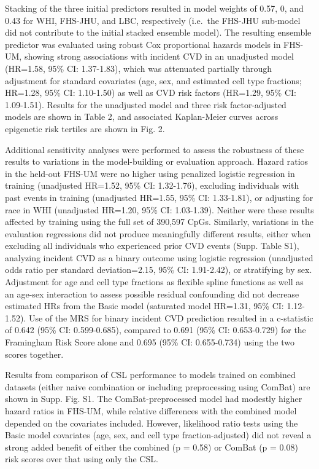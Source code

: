 \documentclass[]{article}
\begin{document}
Stacking of the three initial predictors resulted in model weights of
0.57, 0, and 0.43 for WHI, FHS-JHU, and LBC, respectively (i.e.~the
FHS-JHU sub-model did not contribute to the initial stacked ensemble
model). The resulting ensemble predictor was evaluated using robust Cox
proportional hazards models in FHS-UM, showing strong associations with
incident CVD in an unadjusted model (HR=1.58, 95\% CI: 1.37-1.83), which
was attenuated partially through adjustment for standard covariates
(age, sex, and estimated cell type fractions; HR=1.28, 95\% CI:
1.10-1.50) as well as CVD risk factors (HR=1.29, 95\% CI: 1.09-1.51).
Results for the unadjusted model and three risk factor-adjusted models
are shown in Table 2, and associated Kaplan-Meier curves across
epigenetic risk tertiles are shown in Fig. 2.

Additional sensitivity analyses were performed to assess the robustness
of these results to variations in the model-building or evaluation
approach. Hazard ratios in the held-out FHS-UM were no higher using
penalized logistic regression in training (unadjusted HR=1.52, 95\% CI:
1.32-1.76), excluding individuals with past events in training
(unadjusted HR=1.55, 95\% CI: 1.33-1.81), or adjusting for race in WHI
(unadjusted HR=1.20, 95\% CI: 1.03-1.39). Neither were these results
affected by training using the full set of 390,597 CpGs. Similarly,
variations in the evaluation regressions did not produce meaningfully
different results, either when excluding all individuals who experienced
prior CVD events (Supp. Table S1), analyzing incident CVD as a binary
outcome using logistic regression (unadjusted odds ratio per standard
deviation=2.15, 95\% CI: 1.91-2.42), or stratifying by sex. Adjustment
for age and cell type fractions as flexible spline functions as well as
an age-sex interaction to assess possible residual confounding did not
decrease estimated HRs from the Basic model (saturated model HR=1.31,
95\% CI: 1.12-1.52). Use of the MRS for binary incident CVD prediction
resulted in a c-statistic of 0.642 (95\% CI: 0.599-0.685), compared to
0.691 (95\% CI: 0.653-0.729) for the Framingham Risk Score alone and
0.695 (95\% CI: 0.655-0.734) using the two scores together.

Results from comparison of CSL performance to models trained on combined
datasets (either naive combination or including preprocessing using
ComBat) are shown in Supp. Fig. S1. The ComBat-preprocessed model had
modestly higher hazard ratios in FHS-UM, while relative differences with
the combined model depended on the covariates included. However,
likelihood ratio tests using the Basic model covariates (age, sex, and
cell type fraction-adjusted) did not reveal a strong added benefit of
either the combined (p = 0.58) or ComBat (p = 0.08) risk scores over
that using only the CSL.
\end{document}
